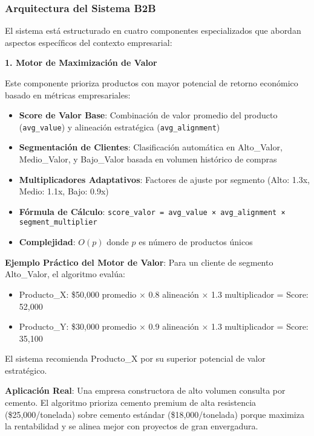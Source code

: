 \documentclass[twocolumn]{article}
\begin{document}
\subsubsection{Arquitectura del Sistema B2B}

El sistema está estructurado en cuatro componentes especializados que abordan aspectos específicos del contexto empresarial:

\textbf{1. Motor de Maximización de Valor}

Este componente prioriza productos con mayor potencial de retorno económico basado en métricas empresariales:

\begin{itemize}
    \item \textbf{Score de Valor Base}: Combinación de valor promedio del producto (\texttt{avg\_value}) y alineación estratégica (\texttt{avg\_alignment})
    \item \textbf{Segmentación de Clientes}: Clasificación automática en Alto\_Valor, Medio\_Valor, y Bajo\_Valor basada en volumen histórico de compras
    \item \textbf{Multiplicadores Adaptativos}: Factores de ajuste por segmento (Alto: 1.3x, Medio: 1.1x, Bajo: 0.9x)
    \item \textbf{Fórmula de Cálculo}: \texttt{score\_valor = avg\_value × avg\_alignment × segment\_multiplier}
    \item \textbf{Complejidad}: \(O(p)\) donde \(p\) es número de productos únicos
\end{itemize}

\textbf{Ejemplo Práctico del Motor de Valor}:
Para un cliente de segmento Alto\_Valor, el algoritmo evalúa:
\begin{itemize}
    \item Producto\_X: \$50,000 promedio × 0.8 alineación × 1.3 multiplicador = Score: 52,000
    \item Producto\_Y: \$30,000 promedio × 0.9 alineación × 1.3 multiplicador = Score: 35,100
\end{itemize}
El sistema recomienda Producto\_X por su superior potencial de valor estratégico.

\textbf{Aplicación Real}: Una empresa constructora de alto volumen consulta por cemento. El algoritmo prioriza cemento premium de alta resistencia (\$25,000/tonelada) sobre cemento estándar (\$18,000/tonelada) porque maximiza la rentabilidad y se alinea mejor con proyectos de gran envergadura.

\vspace{0.3cm}
\end{document}
